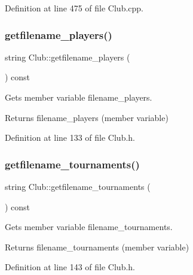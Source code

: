 Definition at line 475 of file Club.\+cpp.

\hypertarget{class_club_a8c96af96a3b46adf1d3d46694452b422}{}\label{class_club_a8c96af96a3b46adf1d3d46694452b422} 
\subsubsection{\texorpdfstring{getfilename\+\_\+players()}{getfilename\_players()}}
{\footnotesize\ttfamily string Club\+::getfilename\+\_\+players (\begin{DoxyParamCaption}{ }\end{DoxyParamCaption}) const\hspace{0.3cm}{\ttfamily [inline]}}



Gets member variable filename\+\_\+players. 

\begin{DoxyReturn}{Returns}
filename\+\_\+players (member variable) 
\end{DoxyReturn}


Definition at line 133 of file Club.\+h.

\hypertarget{class_club_a95dd9fae1bd73060b8a64176aef5b848}{}\label{class_club_a95dd9fae1bd73060b8a64176aef5b848} 
\subsubsection{\texorpdfstring{getfilename\+\_\+tournaments()}{getfilename\_tournaments()}}
{\footnotesize\ttfamily string Club\+::getfilename\+\_\+tournaments (\begin{DoxyParamCaption}{ }\end{DoxyParamCaption}) const\hspace{0.3cm}{\ttfamily [inline]}}



Gets member variable filename\+\_\+tournaments. 

\begin{DoxyReturn}{Returns}
filename\+\_\+tournaments (member variable) 
\end{DoxyReturn}


Definition at line 143 of file Club.\+h.

\hypertarget{class_club_a0807e91626c347847a36551c66e38985}{}\label{class_club_a0807e91626c347847a36551c66e38985} 
